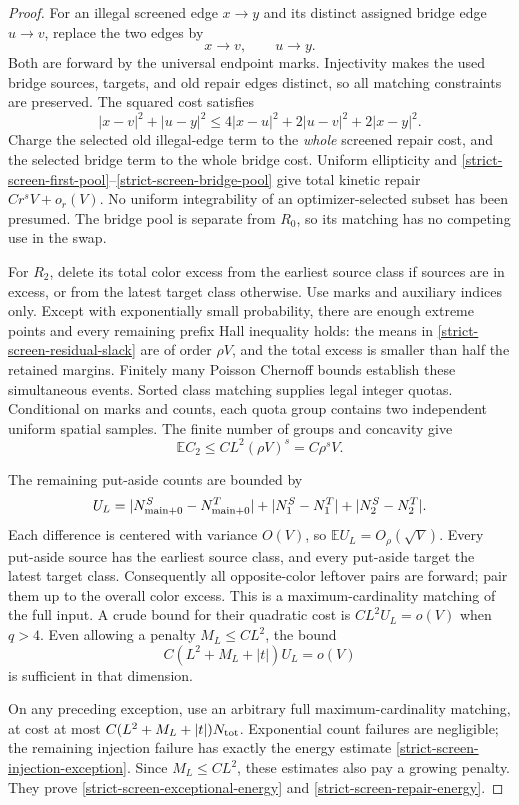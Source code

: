\documentclass[11pt,reqno]{amsart}
\theoremstyle{definition}
\theoremstyle{remark}
\numberwithin{equation}{section}
\newcommand{\E}{\mathbb E}
\begin{document}
\begin{proof}
For an illegal screened edge \(x\to y\) and its distinct assigned
bridge edge \(u\to v\), replace the two edges by
\[
 x\to v,\qquad u\to y.
\]
Both are forward by the universal endpoint marks. Injectivity makes the
used bridge sources, targets, and old repair edges distinct, so all
matching constraints are preserved. The squared cost satisfies
\begin{equation}
\label{strict-screen-swap-cost}
 |x-v|^2+|u-y|^2
       \le4|x-u|^2+2|u-v|^2+2|x-y|^2.
\end{equation}
Charge the selected old illegal-edge term to the \emph{whole} screened
repair cost, and the selected bridge term to the whole bridge cost.
Uniform ellipticity and
\eqref{strict-screen-first-pool}--\eqref{strict-screen-bridge-pool}
give total kinetic repair \(Cr^sV+o_r(V)\). No uniform integrability of
an optimizer-selected subset has been presumed. The bridge pool is
separate from \(R_0\), so its matching has no competing use in the swap.

For \(R_2\), delete its total color excess from the earliest source class
if sources are in excess, or from the latest target class otherwise.
Use marks and auxiliary indices only. Except with exponentially small
probability, there are enough extreme points and every remaining prefix
Hall inequality holds: the means in
\eqref{strict-screen-residual-slack} are of order \(\rho V\), and the
total excess is smaller than half the retained margins. Finitely many
Poisson Chernoff bounds establish these simultaneous events. Sorted
class matching supplies legal integer quotas. Conditional on marks and
counts, each quota group contains two independent uniform spatial
samples. The finite number of groups and concavity give
\begin{equation}
\label{strict-screen-ordinary-pool}
 \E C_2\le C L^2(\rho V)^s=C\rho^sV.
\end{equation}

The remaining put-aside counts are bounded by
\[
 U_L=
 |N_{\rm main+0}^S-N_{\rm main+0}^T|
       +|N_1^S-N_1^T|+|N_2^S-N_2^T|.
\]
Each difference is centered with variance \(O(V)\), so
\(\E U_L=O_\rho(\sqrt V)\). Every put-aside source has the earliest
source class, and every put-aside target the latest target class.
Consequently all opposite-color leftover pairs are forward; pair them
up to the overall color excess. This is a maximum-cardinality matching
of the full input. A crude bound for their quadratic cost is
\(CL^2U_L=o(V)\) when \(q>4\). Even allowing a penalty
\(M_L\le CL^2\), the bound
\[
 C(L^2+M_L+|t|)U_L=o(V)
\]
is sufficient in that dimension.

On any preceding exception, use an arbitrary full maximum-cardinality
matching, at cost at most \(C(L^2+M_L+|t|)N_{\rm tot}\).
Exponential count failures are negligible; the remaining injection
failure has exactly the energy estimate
\eqref{strict-screen-injection-exception}. Since \(M_L\le CL^2\),
these estimates also pay a growing penalty. They prove
\eqref{strict-screen-exceptional-energy} and
\eqref{strict-screen-repair-energy}.
\end{proof}
\end{document}

